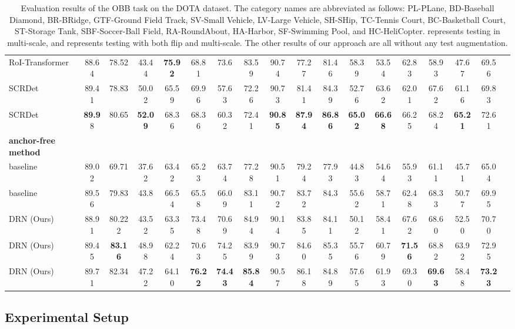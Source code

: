 \documentclass[10pt,twocolumn,letterpaper]{article}
\begin{document}
\begin{table*}
{\begin{tabular}{lccccccccccccccccc}
RoI-Transformer~\cite{ding2019learning} & 88.64 & 78.52 & 43.44 &  \textbf{75.92} & 68.81 &  73.6 & 83.59 & 90.74 & 77.27 & 81.46 & 58.39 & 53.54 & 62.83 & 58.93 & 47.67 & 69.56 \\
SCRDet~\cite{yang2019scrdet}  & 89.41 & 78.83 & 50.02 & 65.59 & 69.96 & 57.63 & 72.26 & 90.73 & 81.41 & 84.39 & 52.76 & 63.62 & 62.01 & 67.62 & 61.16 & 69.83 \\
SCRDet~\cite{yang2019scrdet}  & \textbf{89.9}8 & 80.65 & \textbf{52.09} & 68.36 & 68.36 &  60.32 & 72.41 & \textbf{90.85} & \textbf{87.94} & \textbf{86.86} & \textbf{65.02} & \textbf{66.68} & 66.25 & 68.24 & \textbf{65.21} & 72.61 \\
\hline
\textbf{anchor-free method} \\ \hline
baseline~\cite{zhou2019objects} & 89.02 & 69.71 & 37.62 & 63.42 & 65.23 & 63.74 & 77.28 & 90.51 & 79.24 & 77.93 & 44.83 & 54.64 & 55.93 & 61.11 & 45.71 & 65.04\\
baseline~\cite{zhou2019objects} & 89.56 & 79.83 & 43.8 & 66.54 & 65.58 & 66.09 & 83.11 & 90.72 & 83.72 & 84.3 & 55.62 & 58.71 & 62.48 & 68.33 & 50.77 & 69.95\\
DRN (Ours) & 88.91 & 80.222 & 43.52 & 63.35 & 73.48 & 70.69 & 84.94 & 90.14 & 83.85 & 84.11 & 50.12 & 58.41 & 67.62 & 68.60 & 52.50 & 70.70\\
DRN (Ours) & 89.45 & {\bf83.16} & 48.98 & 62.24 & 70.63 & 74.25 & 83.99 & 90.73 & 84.60 & 85.35 & 55.76 & 60.79 & {\bf71.56} &68.82 & 63.92 & 72.95\\
DRN (Ours) & 89.71 & 82.34 & 47.22 & 64.10 & \textbf{76.22} & \textbf{74.43} & {\bf85.84} & 90.57 & 86.18 & 84.89 & 57.65 & 61.93 & 69.30 & {\bf69.63} & 58.48 & {\bf73.23}\\
\hline
\bottomrule
\end{tabular}}
\caption{Evaluation results of the OBB task on the DOTA dataset. The category names are abbreviated as follows: PL-PLane, BD-Baseball Diamond, BR-BRidge, GTF-Ground Field Track, SV-Small Vehicle, LV-Large Vehicle, SH-SHip, TC-Tennis Court, BC-Basketball Court, ST-Storage Tank, SBF-Soccer-Ball Field, RA-RoundAbout, HA-Harbor, SF-Swimming Pool, and HC-HeliCopter.  represents testing in multi-scale, and  represents testing with both flip and multi-scale. The other results of our approach are all without any test augmentation.}
\label{tab:OBB_HBB}
\end{table*} \subsection{Experimental Setup}
\end{document}
